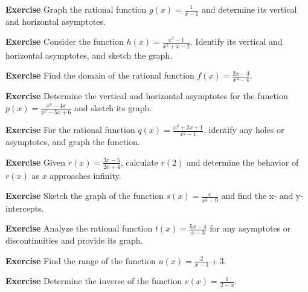 \documentclass[a4paper,12pt]{book}
\newenvironment{exercise}[1][]
  {\par\medskip\noindent\textbf{Exercise #1} \rmfamily}
  {\medskip}
\begin{document}
\begin{exercise}
Graph the rational function \( g(x) = \frac{1}{x - 1} \) and determine its vertical and horizontal asymptotes.
\end{exercise}

\begin{exercise}
Consider the function \( h(x) = \frac{x^2 - 1}{x^2 + x - 2} \). Identify its vertical and horizontal asymptotes, and sketch the graph.
\end{exercise}

\begin{exercise}
Find the domain of the rational function \( f(x) = \frac{2x - 3}{x^2 - 4} \).
\end{exercise}

\begin{exercise}
Determine the vertical and horizontal asymptotes for the function \( p(x) = \frac{x^3 - 4x}{x^2 - 5x + 6} \) and sketch its graph.
\end{exercise}

\begin{exercise}
For the rational function \( q(x) = \frac{x^2 + 2x + 1}{x^2 - 1} \), identify any holes or asymptotes, and graph the function.
\end{exercise}

\begin{exercise}
Given \( r(x) = \frac{3x - 5}{2x + 4} \), calculate \( r(2) \) and determine the behavior of \( r(x) \) as \( x \) approaches infinity.
\end{exercise}

\begin{exercise}
Sketch the graph of the function \( s(x) = \frac{x}{x^2 - 9} \) and find the x- and y-intercepts.
\end{exercise}

\begin{exercise}
Analyze the rational function \( t(x) = \frac{5x - 4}{x - 3} \) for any asymptotes or discontinuities and provide its graph.
\end{exercise}

\begin{exercise}
Find the range of the function \( u(x) = \frac{2}{x - 1} + 3 \).
\end{exercise}

\begin{exercise}
Determine the inverse of the function \( v(x) = \frac{1}{2 - x} \).
\end{exercise}
\end{document}
